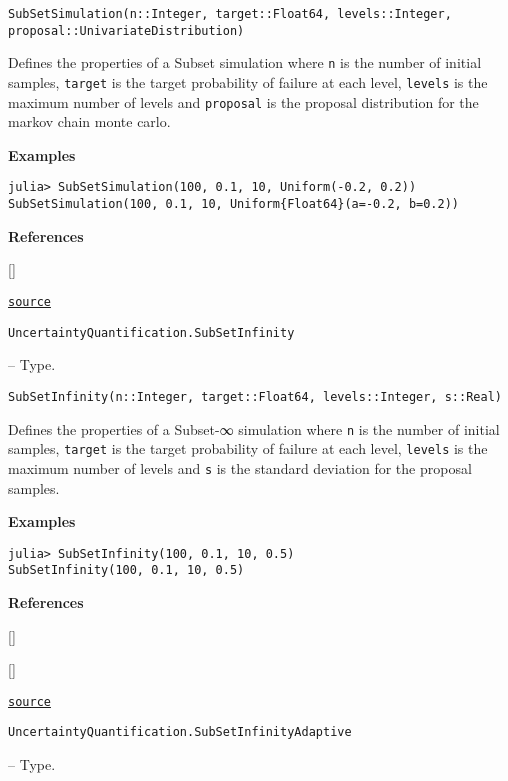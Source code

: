 \begin{adjustwidth}{2em}{0pt}


\begin{verbatim}
SubSetSimulation(n::Integer, target::Float64, levels::Integer, proposal::UnivariateDistribution)
\end{verbatim}

Defines the properties of a Subset simulation where \texttt{n} is the number of initial samples, \texttt{target} is the target probability of failure at each level, \texttt{levels} is the maximum number of levels and \texttt{proposal} is the proposal distribution for the markov chain monte carlo.

\textbf{Examples}


\begin{verbatim}
julia> SubSetSimulation(100, 0.1, 10, Uniform(-0.2, 0.2))
SubSetSimulation(100, 0.1, 10, Uniform{Float64}(a=-0.2, b=0.2))
\end{verbatim}

\textbf{References}

[]



\href{https://github.com/friesischscott/UncertaintyQuantification.jl/blob/f5ee6cce729f0d6a57979257379c942cdf42f86f/src/simulations/subset.jl#L3-L20}{\texttt{source}}


\end{adjustwidth}
\hypertarget{18397467037730927218}{\texttt{UncertaintyQuantification.SubSetInfinity}}  -- {Type.}

\begin{adjustwidth}{2em}{0pt}


\begin{verbatim}
SubSetInfinity(n::Integer, target::Float64, levels::Integer, s::Real)
\end{verbatim}

Defines the properties of a Subset-∞ simulation where \texttt{n} is the number of initial samples, \texttt{target} is the target probability of failure at each level, \texttt{levels} is the maximum number of levels and \texttt{s} is the standard deviation for the proposal samples.

\textbf{Examples}


\begin{verbatim}
julia> SubSetInfinity(100, 0.1, 10, 0.5)
SubSetInfinity(100, 0.1, 10, 0.5)
\end{verbatim}

\textbf{References}

[]

[]



\href{https://github.com/friesischscott/UncertaintyQuantification.jl/blob/f5ee6cce729f0d6a57979257379c942cdf42f86f/src/simulations/subset.jl#L43-L62}{\texttt{source}}


\end{adjustwidth}
\hypertarget{532901089789295354}{\texttt{UncertaintyQuantification.SubSetInfinityAdaptive}}  -- {Type.}

